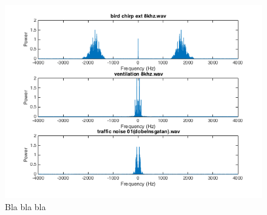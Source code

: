 \begin{figure}
  \centering
  \includegraphics[width=1\textwidth]{sections/freq_spec_noise_linkaxis.png}
  \caption{Bla bla bla}
  \label{fig:noise_spec}
\end{figure}
